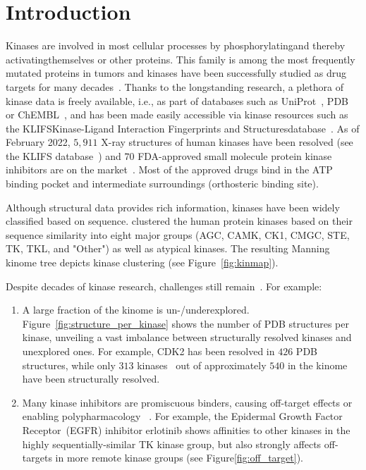 \documentclass[9pt,training,ASAPversion]{livecoms}
\begin{document}
\section{Introduction}
Kinases are involved in most cellular processes by phosphorylating\textemdash and thereby activating\textemdash themselves or other proteins. This family is among the most frequently mutated proteins in tumors and kinases have been successfully studied as drug targets for many decades~\cite{Cohen_2021_NatRevDrugDiscov}. Thanks to the longstanding research, a plethora of kinase data is freely available, i.e., as part of databases such as UniProt~\cite{uniprot_consortium_2020_nar}, PDB~\cite{Berman_2000_NAR} or ChEMBL~\cite{Gaulton_2016_nar}, and has been made easily accessible via kinase resources such as the KLIFS\textemdash Kinase-Ligand Interaction Fingerprints and Structures\textemdash database~\cite{Kanev_2020_NAR}. As of February 2022, $5,911$ X-ray structures of human kinases have been resolved (see the KLIFS database~\cite{klifs_feb_2022}) and $70$ FDA-approved small molecule protein kinase inhibitors are on the market~\cite{FDA_PKI_2022}. Most of the approved drugs bind in the ATP binding pocket and intermediate surroundings (orthosteric binding site).

Although structural data provides rich information, kinases have been widely classified based on sequence. \citet{Manning_2022_science} clustered the human protein kinases based on their sequence similarity into eight major groups (AGC, CAMK, CK1, CMGC, STE, TK, TKL, and "Other") as well as atypical kinases. The resulting Manning kinome tree depicts kinase clustering (see Figure~\ref{fig:kinmap}).

Despite decades of kinase research, challenges still remain~\cite{Kooistra_2017_AnnualReportsMedicinalChemistry}. For example: \begin{enumerate}
    \item A large fraction of the kinome is un-/underexplored. Figure~\ref{fig:structure_per_kinase} shows the number of PDB structures per kinase, unveiling a vast imbalance between structurally resolved kinases and unexplored ones. For example, CDK2 has been resolved in $426$ PDB structures, while only $313$ kinases~\cite{klifs_feb_2022} out of approximately $540$ in the kinome~\cite{Kooistra_2017_AnnualReportsMedicinalChemistry} have been structurally resolved.
    \item Many kinase inhibitors are promiscuous binders, causing off-target effects or enabling polypharmacology ~\cite{Cohen_2021_NatRevDrugDiscov, Morphy_2009_JMedChem}. For example, the Epidermal Growth Factor Receptor~(EGFR) inhibitor erlotinib shows affinities to other kinases in the highly sequentially-similar TK kinase group, but also strongly affects off-targets in more remote kinase groups (see Figure\ref{fig:off_target}).
\end{enumerate}
\end{document}
